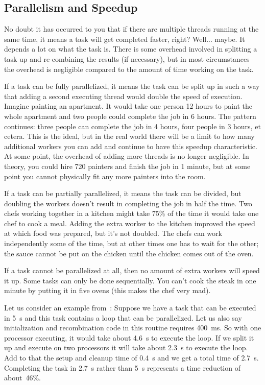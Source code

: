 \subsection*{Parallelism and Speedup}

No doubt it has occurred to you that if there are multiple threads running at the same time, it means a task will get completed faster, right? Well... maybe. It depends a lot on what the task is. There is some overhead involved in splitting a task up and re-combining the results (if necessary), but in most circumstances the overhead is negligible compared to the amount of time working on the task.

If a task can be fully parallelized, it means the task can be split up in such a way that adding a second executing thread would double the speed of execution. Imagine painting an apartment. It would take one person 12 hours to paint the whole apartment and two people could complete the job in 6 hours. The pattern continues: three people can complete the job in 4 hours, four people in 3 hours, et cetera. This is the ideal, but in the real world there will be a limit to how many additional workers you can add and continue to have this speedup characteristic. At some point, the overhead of adding more threads is no longer negligible. In theory, you could hire 720 painters and finish the job in 1 minute, but at some point you cannot physically fit any more painters into the room.

If a task can be partially parallelized, it means the task can be divided, but doubling the workers doesn't result in completing the job in half the time. Two chefs working together in a kitchen might take 75\% of the time it would take one chef to cook a meal. Adding the extra worker to the kitchen improved the speed at which food was prepared, but it's not doubled. The chefs can work independently some of the time, but at other times one has to wait for the other; the sauce cannot be put on the chicken until the chicken comes out of the oven.

If a task cannot be parallelized at all, then no amount of extra workers will speed it up. Some tasks can only be done sequentially. You can't cook the steak in one minute by putting it in five ovens (this makes the chef very mad).

Let us consider an example from~\cite{mte241}: Suppose we have a task that can be executed in 5~s and this task contains a loop that can be parallelized. Let us also say initialization and recombination code in this routine requires 400~ms. So with one processor executing, it would take about 4.6~s to execute the loop. If we split it up and execute on two processors it will take about 2.3~s to execute the loop. Add to that the setup and cleanup time of 0.4~s and we get a total time of 2.7~s. Completing the task in 2.7~s rather than 5~s represents a time reduction of about~46\%.

